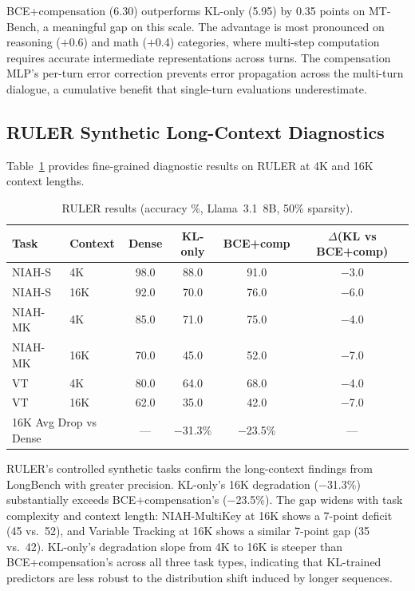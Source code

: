\documentclass[11pt]{article}
\begin{document}
BCE+compensation (6.30) outperforms KL-only (5.95) by 0.35 points on MT-Bench, a meaningful gap on this scale.
The advantage is most pronounced on reasoning ($+$0.6) and math ($+$0.4) categories, where multi-step computation requires accurate intermediate representations across turns.
The compensation MLP's per-turn error correction prevents error propagation across the multi-turn dialogue, a cumulative benefit that single-turn evaluations underestimate.

\subsection{RULER Synthetic Long-Context Diagnostics}

Table~\ref{tab:ruler} provides fine-grained diagnostic results on RULER at 4K and 16K context lengths.

\begin{table}[h]
\centering
\caption{RULER results (accuracy \%, Llama~3.1~8B, 50\% sparsity).}
\label{tab:ruler}
\small
\begin{tabular}{llcccc}
\toprule
Task & Context & Dense & KL-only & BCE+comp & $\Delta$(KL vs BCE+comp) \\
\midrule
NIAH-S & 4K & 98.0 & 88.0 & 91.0 & $-$3.0 \\
NIAH-S & 16K & 92.0 & 70.0 & 76.0 & $-$6.0 \\
NIAH-MK & 4K & 85.0 & 71.0 & 75.0 & $-$4.0 \\
NIAH-MK & 16K & 70.0 & 45.0 & 52.0 & $-$7.0 \\
VT & 4K & 80.0 & 64.0 & 68.0 & $-$4.0 \\
VT & 16K & 62.0 & 35.0 & 42.0 & $-$7.0 \\
\midrule
\multicolumn{2}{l}{16K Avg Drop vs Dense} & --- & $-$31.3\% & $-$23.5\% & --- \\
\bottomrule
\end{tabular}
\end{table}

RULER's controlled synthetic tasks confirm the long-context findings from LongBench with greater precision.
KL-only's 16K degradation ($-$31.3\%) substantially exceeds BCE+compensation's ($-$23.5\%).
The gap widens with task complexity and context length: NIAH-MultiKey at 16K shows a 7-point deficit (45 vs.\ 52), and Variable Tracking at 16K shows a similar 7-point gap (35 vs.\ 42).
KL-only's degradation slope from 4K to 16K is steeper than BCE+compensation's across all three task types, indicating that KL-trained predictors are less robust to the distribution shift induced by longer sequences.
\end{document}
